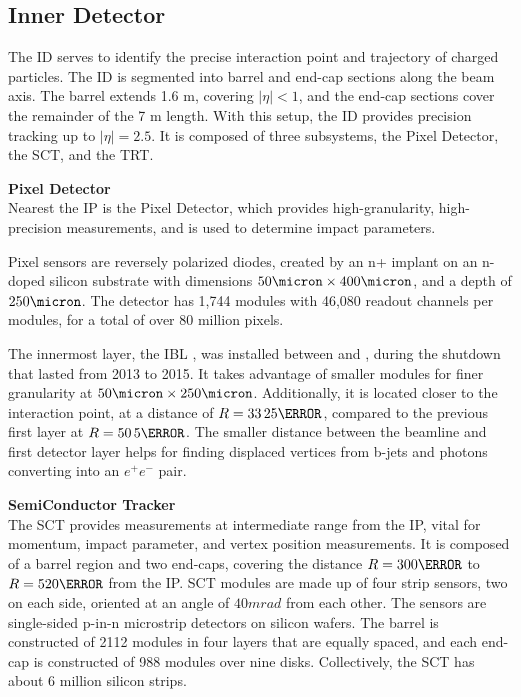 \subsection{Inner Detector}  \label{ssec:innerdetector}

The \gls{ID} \cite{inner-detector-tdr} serves to identify the precise interaction point and trajectory of charged particles. The \gls{ID} is segmented into barrel and end-cap sections along the beam axis. The barrel extends 1.6 m, covering $|\eta| < 1$, and the end-cap sections cover the remainder of the 7 m length. With this setup, the \gls{ID} provides precision tracking up to $|\eta| = 2.5$. It is composed of three subsystems, the Pixel Detector, the \gls{SCT}, and the \gls{TRT}.

\noindent\textbf{Pixel Detector}\\
\indent Nearest the \gls{IP} is the Pixel Detector, which provides high-granularity, high-precision measurements, and is used to determine impact parameters.

Pixel sensors are reversely polarized diodes, created by an n+ implant on an n-doped silicon substrate with dimensions $ \unit{50}{\micron} \times \unit{400}{\micron}$, and a depth of $\unit{250}{\micron}$. The detector has 1,744 modules with 46,080 readout channels per modules, for a total of over 80 million pixels.
    
The innermost layer, the \gls{IBL} \cite{ibl-tdr}, was installed between \RunOne and \RunTwo, during the shutdown that lasted from 2013 to 2015. It takes advantage of smaller modules for finer granularity at $\unit{50}{\micron} \times \unit{250}{\micron}$. Additionally, it is located closer to the interaction point, at a distance of $R=\unit{33.25}{\mm}$, compared to the previous first layer at $R=\unit{50.5}{\mm}$. The smaller distance between the beamline and first detector layer helps for finding displaced vertices from b-jets and photons converting into an $e^+e^-$ pair.

\noindent\textbf{SemiConductor Tracker}\\
\indent The \gls{SCT} provides measurements at intermediate range from the \gls{IP}, vital for momentum, impact parameter, and vertex position measurements. It is composed of a barrel region and two end-caps, covering the distance $R=\unit{300}{\mm}$ to $R= \unit{520}{\mm}$ from the \gls{IP}. \gls{SCT} modules are made up of four strip sensors, two on each side, oriented at an angle of $\unit{40}{mrad}$ from each other. The sensors are single-sided p-in-n microstrip detectors on silicon wafers. The barrel is constructed of 2112 modules in four layers that are equally spaced, and each end-cap is constructed of 988 modules over nine disks. Collectively, the \gls{SCT} has about 6 million silicon strips.

